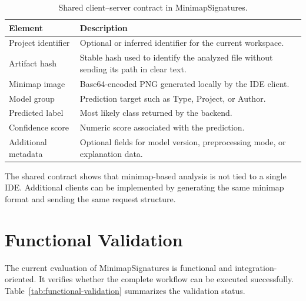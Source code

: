 \begin{table}[ht]
\centering
\caption{Shared client--server contract in MinimapSignatures.}
\label{tab:tool-contract}
\begin{tabular}{p{}p{}}
\toprule
\textbf{Element} & \textbf{Description} \\
\midrule
Project identifier & Optional or inferred identifier for the current workspace. \\
Artifact hash & Stable hash used to identify the analyzed file without sending its path in clear text. \\
Minimap image & Base64-encoded PNG generated locally by the IDE client. \\
Model group & Prediction target such as Type, Project, or Author. \\
Predicted label & Most likely class returned by the backend. \\
Confidence score & Numeric score associated with the prediction. \\
Additional metadata & Optional fields for model version, preprocessing mode, or explanation data. \\
\bottomrule
\end{tabular}
\fautor
\end{table}

The shared contract shows that minimap-based analysis is not tied to a single
IDE. Additional clients can be implemented by generating the same minimap format
and sending the same request structure.

\section{Functional Validation}

The current evaluation of MinimapSignatures is functional and
integration-oriented. It verifies whether the complete workflow can be executed
successfully. Table~\ref{tab:functional-validation} summarizes the validation
status.

